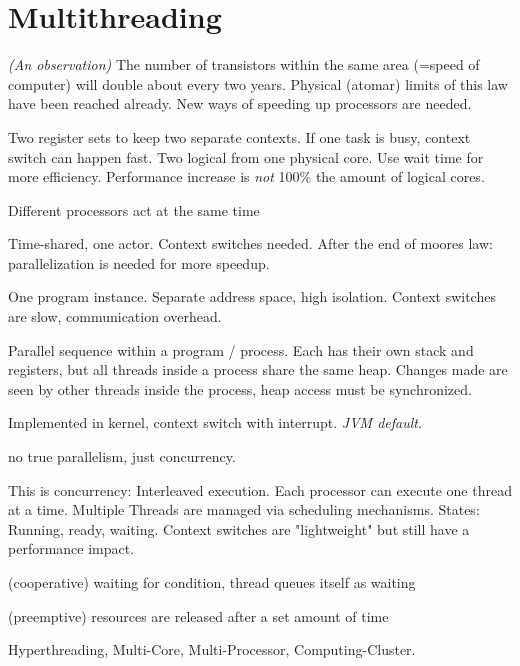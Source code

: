 \section{Multithreading}

\begin{description}[itemsep=-1pt]
  \item[Moores Law] \textit{(An observation)} The number of transistors within the same area (=speed of computer) will double about every two years.   Physical (atomar) limits of this law have been reached already. New ways of speeding up processors are needed.
  
  \item[Hyperthreading] Two register sets to keep two separate contexts. If one task is busy, context switch can happen fast. Two logical from one physical core. Use wait time for more efficiency. 
  Performance increase is \emph{not} 100\% the amount of logical cores.
  
  \item[Parallel] Different processors act at the same time
  
  \item[Concurrent] Time-shared, one actor. Context switches needed.
  After the end of moores law: parallelization is needed for more speedup.
  
  \item[Process] One program instance. Separate address space, high isolation. Context switches are slow, communication overhead.
  
  \item[Thread] Parallel sequence within a program / process. Each has their own stack and registers, but all threads inside a process share the same heap. Changes made are seen by other threads inside the process, heap access must be synchronized.
  
  \item[Kernel thread] Implemented in kernel, context switch with interrupt. \textit{JVM default}.
  \item[User thread] no true parallelism, just concurrency.

  \item[Thread Scheduling / Processor Multiplexing] This is concurrency: Interleaved execution. 
  Each processor can execute one thread at a time. Multiple Threads are managed via scheduling mechanisms.
  States: Running, ready, waiting.
  Context switches are "lightweight" but still have a performance impact.

  \item[synchronous] (cooperative) waiting for condition, thread queues itself as waiting
  \item[asynchronous] (preemptive) resources are released after a set amount of time
  \item[Levels of parallelism] Hyperthreading, Multi-Core, Multi-Processor, Computing-Cluster.
\end{description}

